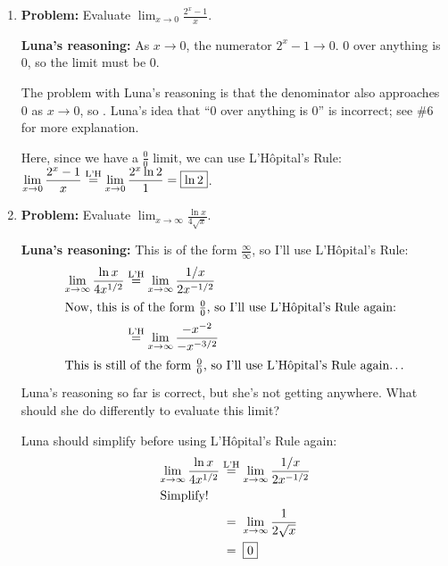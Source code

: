 \documentclass{article}
\begin{document}
\begin{enumerate}
\begin{enumerate}
  \item
    \begin{problem}[\vfill]
      \textbf{Problem:} Evaluate $\displaystyle \lim_{x \to 0} \frac{2^x -
        1}{x}$.

      \textbf{Luna's reasoning:} As $x \to 0$, the numerator $2^x - 1 \to
      0$.  0 over anything is 0, so the limit must be 0.
    \end{problem}

    \begin{solution}
      The problem with Luna's reasoning is that the denominator also
      approaches $0$ as $x \to 0$, so .  Luna's idea that ``0 over anything is 0'' is incorrect;
      see {{\#6}} for more explanation.

      Here, since we have a $\frac{0}{0}$ limit, we can use L'H\^opital's
      Rule: $\displaystyle \lim_{x\to 0} \frac{2^x - 1}{x} \stackrel{\text{L'H}}{=}
      \lim_{x\to 0} \frac{2^x\ln 2}{1} = \boxed{\ln 2}$.
    \end{solution}

  \item
    \begin{problem}[\vfill\newpage]
      \textbf{Problem:} Evaluate $\displaystyle \lim_{x \to \infty}
      \frac{\ln x}{4 \sqrt{x}}$.

      \textbf{Luna's reasoning:} This is of the form
      $\frac{\infty}{\infty}$, so I'll use L'H\^opital's Rule:
      \begin{align*}
        \lim_{x \to \infty} \frac{\ln x}{4 x^{1/2}} & \lheq
        \lim_{x \to \infty} \frac{1/x}{2 x^{-1/2}} \\
        \intertext{Now, this is of the form $\frac{0}{0}$, so I'll use
          L'H\^opital's Rule again:} %
        & \lheq \lim_{x \to \infty} \frac{-x^{-2}}{-
          x^{-3/2}} \\
        \intertext{This is still of the form $\frac{0}{0}$, so I'll use
          L'H\^opital's Rule again\ldots}
      \end{align*}
      Luna's reasoning so far is correct, but she's not getting anywhere.
      What should she do differently to evaluate this limit?
    \end{problem}

    \begin{solution}
      Luna should simplify before using L'H\^opital's Rule again:
      \begin{align*}
        \lim_{x \to \infty} \frac{\ln x}{4 x^{1/2}} & \lheq
        \lim_{x \to \infty} \frac{1/x}{2 x^{-1/2}} \\
        \shortintertext{Simplify!}
        & \nolheq \lim_{x \to \infty} \frac{1}{2 \sqrt{x}} \\
        & \nolheq \boxed{0}
      \end{align*}      
    \end{solution}


\end{enumerate}
\end{enumerate}
\end{document}
